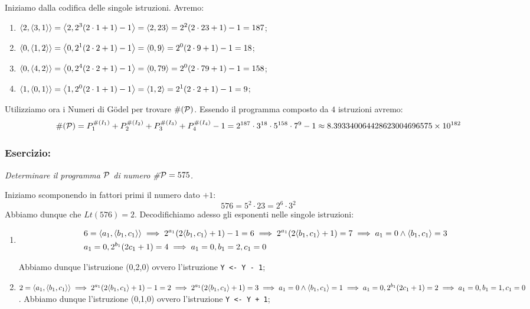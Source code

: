 Iniziamo dalla codifica delle singole istruzioni. Avremo:
\begin{enumerate}
    \item \(\displaystyle{\left\langle{ 2,\displaystyle{\left\langle{ 3,1}\right\rangle}}\right\rangle}= \displaystyle{\left\langle{ 2,2^3(2\cdot 1 +1)-1}\right\rangle} = \displaystyle{\left\langle{ 2,23}\right\rangle} = 2^2(2\cdot 23 + 1) - 1 = 187\);
    \item \(\displaystyle{\left\langle{ 0,\displaystyle{\left\langle{ 1,2}\right\rangle}}\right\rangle}= \displaystyle{\left\langle{ 0,2^1(2\cdot 2 +1)-1}\right\rangle} = \displaystyle{\left\langle{ 0,9}\right\rangle} = 2^0(2\cdot 9 + 1) - 1 = 18\);
    \item \(\displaystyle{\left\langle{ 0,\displaystyle{\left\langle{ 4,2}\right\rangle}}\right\rangle}= \displaystyle{\left\langle{ 0,2^4(2\cdot 2 + 1)-1}\right\rangle} = \displaystyle{\left\langle{ 0,79}\right\rangle} = 2^0(2\cdot 79 + 1)-1= 158\);
    \item \(\displaystyle{\left\langle{ 1,\displaystyle{\left\langle{ 0,1}\right\rangle}}\right\rangle}= \displaystyle{\left\langle{ 1,2^0(2\cdot 1 +1)-1}\right\rangle} = \displaystyle{\left\langle{ 1,2}\right\rangle} = 2^1(2\cdot 2 + 1) - 1 = 9\);
\end{enumerate}
Utilizziamo ora i Numeri di Gödel per trovare \(\# (\mathcal{P})\). Essendo il programma composto da \(4\) istruzioni avremo:
\begin{equation}
    \# (\mathcal{P}) = P_1^{\# (I_1)} + P_2^{\# (I_2)} + P_3^{\# (I_3)} + P_4^{\# (I_4)} - 1= 2^{187} \cdot 3^{18} \cdot 5^{158} \cdot 7^9 -1\approx 8.393340064428623004696575 \times  10^{182}
\end{equation}

\subsubsection{Esercizio:} \textit{Determinare il programma \(\mathcal{P}\) di numero \#\(\mathcal{P}=575\).}

Iniziamo scomponendo in fattori primi il numero dato \(+1\):
\begin{equation}
    576 = 5^2 \cdot 23= 2^6 \cdot 3^2
\end{equation}
Abbiamo dunque che \(Lt(576)=2\). Decodifichiamo adesso gli esponenti nelle singole istruzioni:
\begin{enumerate}
    \item
    \begin{equation}
        \begin{split}
            &6 = \displaystyle{\left\langle{ a_1,\displaystyle{\left\langle{ b_1,c_1}\right\rangle}}\right\rangle} \implies 2^{a_1}(2\displaystyle{\left\langle{ b_1,c_1}\right\rangle}+1)-1=6 \implies 2^{a_1}(2\displaystyle{\left\langle{ b_1,c_1}\right\rangle}+1)=7 \implies a_1=0 \land \displaystyle{\left\langle{ b_1,c_1}\right\rangle} =3 \\
            &a_1 =0, 2^{b_1}(2c_1+1)=4 \implies a_1=0, b_1=2, c_1=0
        \end{split}
    \end{equation}

    Abbiamo dunque l'istruzione (0,2,0) ovvero l'istruzione \lstinline{Y <- Y - 1}; %
    \item \(2 = \displaystyle{\left\langle{ a_1,\displaystyle{\left\langle{ b_1,c_1}\right\rangle}}\right\rangle} \implies 2^{a_1}(2\displaystyle{\left\langle{ b_1,c_1}\right\rangle}+1)-1=2 \implies 2^{a_1}(2\displaystyle{\left\langle{ b_1,c_1}\right\rangle}+1)=3 \implies a_1=0 \land \displaystyle{\left\langle{ b_1,c_1}\right\rangle} =1 \implies a_1=0, 2^{b_1}(2c_1+1)=2 \implies a_1=0, b_1=1, c_1=0\). Abbiamo dunque l'istruzione (0,1,0) ovvero l'istruzione \lstinline{Y <- Y + 1};
\end{enumerate}

